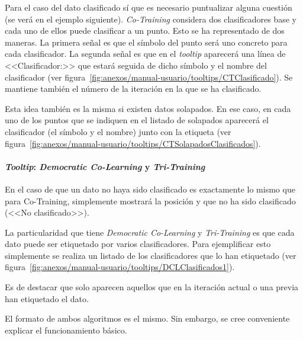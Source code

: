 Para el caso del dato clasificado sí que es necesario puntualizar alguna
cuestión (se verá en el ejemplo siguiente). \textit{Co-Training} considera dos
clasificadores base y cada uno de ellos puede clasificar a un punto. Esto se ha
representado de dos maneras. La primera señal es que el símbolo del punto será
uno concreto para cada clasificador. La segunda señal es que en el
\textit{tooltip} aparecerá una línea de <<Clasificador:>> que estará seguida de
dicho símbolo y el nombre del clasificador (ver
figura~\ref{fig:anexos/manual-usuario/tooltips/CTClasificado}). Se mantiene
también el número de la iteración en la que se ha clasificado.


Esta idea también es la misma si existen datos solapados. En ese caso, en cada
uno de los puntos que se indiquen en el listado de solapados aparecerá el
clasificador (el símbolo y el nombre) junto con la etiqueta (ver
figura~\ref{fig:anexos/manual-usuario/tooltips/CTSolapadosClasificados}).


\paragraph{\textit{Tooltip}: \textit{Democratic Co-Learning} y \textit{Tri-Training}}

En el caso de que un dato no haya sido clasificado es exactamente lo mismo que
para Co-Training, simplemente mostrará la posición y que no ha sido clasificado
(<<No clasificado>>).

La particularidad que tiene \textit{Democratic Co-Learning} y
\textit{Tri-Training} es que cada dato puede ser etiquetado por varios
clasificadores. Para ejemplificar esto simplemente se realiza un listado de los
clasificadores que lo han etiquetado (ver
figura~\ref{fig:anexos/manual-usuario/tooltips/DCLClasificados1}).


Es de destacar que solo aparecen aquellos que en la iteración actual o una
previa han etiquetado el dato.

El formato de ambos algoritmos es el mismo. Sin embargo, se cree conveniente
explicar el funcionamiento básico.

